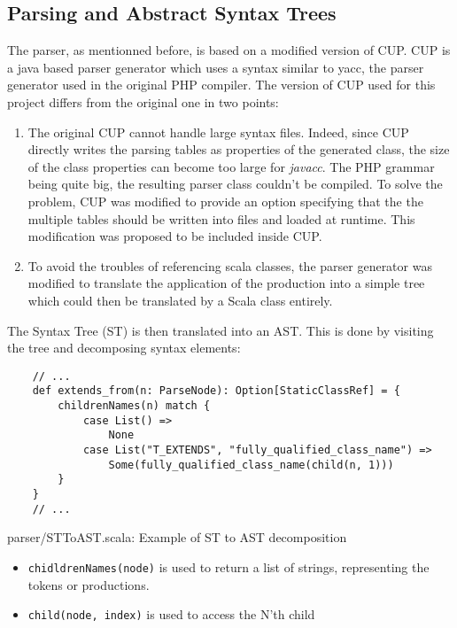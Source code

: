 \documentclass[a4paper]{article}
\begin{document}
\subsection{Parsing and Abstract Syntax Trees}
The parser, as mentionned before, is based on a modified version of CUP. CUP is
a java based parser generator which uses a syntax similar to yacc, the parser
generator used in the original PHP compiler. The version of CUP used for this
project differs from the original one in two points:
\begin{enumerate}
  \item The original CUP cannot handle large syntax files. Indeed, since CUP
    directly writes the parsing tables as properties of the generated class,
    the size of the class properties can become too large for \emph{javacc}. The
    PHP grammar being quite big, the resulting parser class couldn't be compiled.
    To solve the problem, CUP was modified to provide an option specifying that the
    the multiple tables should be written into files and loaded at runtime. This
    modification was proposed to be included inside CUP.
  \item To avoid the troubles of referencing scala classes, the parser
    generator was modified to translate the application of the production into a
    simple tree which could then be translated by a Scala class entirely.
\end{enumerate}

The Syntax Tree (ST) is then translated into an AST. This is done by visiting
the tree and decomposing syntax elements:

\begin{listing}
\begin{verbatim}
    // ...
    def extends_from(n: ParseNode): Option[StaticClassRef] = {
        childrenNames(n) match {
            case List() =>
                None
            case List("T_EXTENDS", "fully_qualified_class_name") =>
                Some(fully_qualified_class_name(child(n, 1)))
        }
    }
    // ...
\end{verbatim}
  \caption{parser/STToAST.scala: Example of ST to AST decomposition}
\end{listing}

\begin{itemize}
  \item \verb=chidldrenNames(node)= is used to return a list of strings,
    representing the tokens or productions.
  \item \verb=child(node, index)= is used to access the N'th child
\end{itemize}
\end{document}
